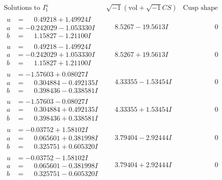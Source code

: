 \documentclass[1p]{elsarticle_modified}
\theoremstyle{definition}
\newcommand{\I}{\sqrt{-1}}
\begin{document}
$$\begin{array}{c|c|c}
\text{Solutions to }I^u_{1}& \I (\text{vol} + \sqrt{-1}CS) & \text{Cusp shape}\\
 \hline 
\begin{aligned}
u &= \phantom{-}0.49218 + 1.49924 I \\
a &= -0.242029 - 1.053330 I \\
b &= \phantom{-}1.15827 - 1.21100 I\end{aligned}
 & \phantom{-}8.5267 - 19.5613 I & \phantom{-0.000000 } 0 \\ \hline\begin{aligned}
u &= \phantom{-}0.49218 - 1.49924 I \\
a &= -0.242029 + 1.053330 I \\
b &= \phantom{-}1.15827 + 1.21100 I\end{aligned}
 & \phantom{-}8.5267 + 19.5613 I & \phantom{-0.000000 } 0 \\ \hline\begin{aligned}
u &= -1.57603 + 0.08027 I \\
a &= \phantom{-}0.304884 - 0.492135 I \\
b &= \phantom{-}0.398436 - 0.338581 I\end{aligned}
 & \phantom{-}4.33355 - 1.53454 I & \phantom{-0.000000 } 0 \\ \hline\begin{aligned}
u &= -1.57603 - 0.08027 I \\
a &= \phantom{-}0.304884 + 0.492135 I \\
b &= \phantom{-}0.398436 + 0.338581 I\end{aligned}
 & \phantom{-}4.33355 + 1.53454 I & \phantom{-0.000000 } 0 \\ \hline\begin{aligned}
u &= -0.03752 + 1.58102 I \\
a &= \phantom{-}0.065601 + 0.381998 I \\
b &= \phantom{-}0.325751 + 0.605320 I\end{aligned}
 & \phantom{-}3.79404 - 2.92444 I & \phantom{-0.000000 } 0 \\ \hline\begin{aligned}
u &= -0.03752 - 1.58102 I \\
a &= \phantom{-}0.065601 - 0.381998 I \\
b &= \phantom{-}0.325751 - 0.605320 I\end{aligned}
 & \phantom{-}3.79404 + 2.92444 I & \phantom{-0.000000 } 0 \\ \hline\begin{aligned}

\end{aligned}
\end{array}$$
\end{document}
